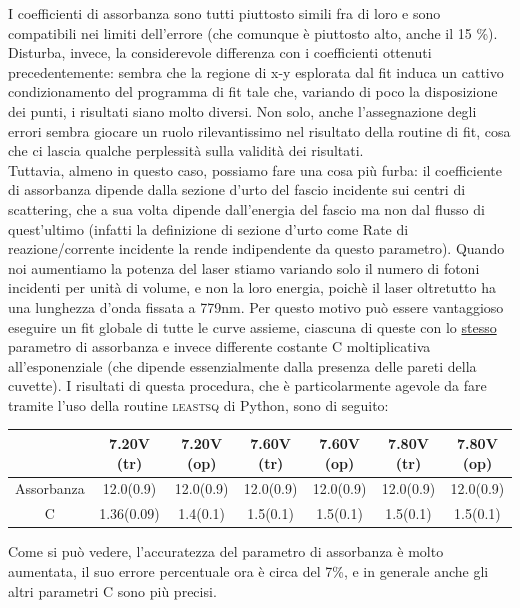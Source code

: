 \documentclass[10pt,letterpaper]{article}
\begin{document}
I coefficienti di assorbanza sono tutti piuttosto simili fra di loro e sono compatibili nei limiti dell'errore (che comunque è piuttosto alto, anche il 15 \%). Disturba, invece, la considerevole differenza con i coefficienti ottenuti precedentemente: sembra che la regione di x-y esplorata dal fit induca un cattivo condizionamento del programma di fit tale che, variando di poco la disposizione dei punti, i risultati siano molto diversi. Non solo, anche l'assegnazione degli errori sembra giocare un ruolo rilevantissimo nel risultato della routine di fit, cosa che ci lascia qualche perplessità sulla validità dei risultati.\\
Tuttavia, almeno in questo caso, possiamo fare una cosa più furba: il coefficiente di assorbanza dipende dalla sezione d'urto del fascio incidente sui centri di scattering, che a sua volta dipende dall'energia del fascio ma non dal flusso di quest'ultimo (infatti la definizione di sezione d'urto come Rate di reazione/corrente incidente la rende indipendente da questo parametro). Quando noi aumentiamo la potenza del laser stiamo variando solo il numero di fotoni incidenti per unità di volume, e non la loro energia, poichè il laser oltretutto ha una lunghezza d'onda fissata a 779nm. Per questo motivo può essere vantaggioso eseguire un fit globale di tutte le curve assieme, ciascuna di queste con lo \underline{stesso} parametro di assorbanza e invece differente costante C moltiplicativa all'esponenziale (che dipende essenzialmente dalla presenza delle pareti della cuvette). I risultati di questa procedura, che è particolarmente agevole da fare tramite l'uso della routine \textsc{leastsq} di Python, sono di seguito:

\begin{table}[h]
\centering
\begin{tabular}{c|c|c|c|c|c|c}
 & \textbf{7.20}V (tr) & \textbf{7.20V} (op)  & \textbf{7.60V} (tr) & \textbf{7.60V} (op) & \textbf{7.80V} (tr) & \textbf{7.80V} (op)\\ 
\hline Assorbanza & 12.0(0.9) & 12.0(0.9) & 12.0(0.9) & 12.0(0.9) & 12.0(0.9) & 12.0(0.9) \\ 
 C & 1.36(0.09) & 1.4(0.1) & 1.5(0.1) & 1.5(0.1) & 1.5(0.1) & 1.5(0.1)\\ 
\hline
\end{tabular}
\end{table}

Come si può vedere, l'accuratezza del parametro di assorbanza è molto aumentata, il suo errore percentuale ora è circa del 7\%, e in generale anche gli altri parametri C sono più precisi.
\end{document}
